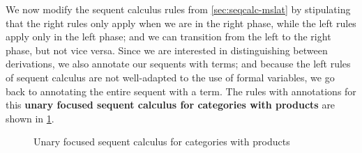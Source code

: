 We now modify the sequent calculus rules from \cref{sec:seqcalc-mslat} by stipulating that
the right rules only apply when we are in the right phase,
while the left rules apply only in the left phase;
and we can transition from the left to the right phase, but not vice versa.
Since we are interested in distinguishing between derivations, we also annotate our sequents with terms; and
because the left rules of sequent calculus are not well-adapted to the use of formal variables, we go back to annotating the entire sequent with a term.
The rules with annotations for this \textbf{unary focused sequent calculus for categories with products} are shown in \cref{fig:catprod-focused-seqcalc}.

\begin{figure}
  \centering
  \caption{Unary focused sequent calculus for categories with products}
  \label{fig:catprod-focused-seqcalc}
\end{figure}

